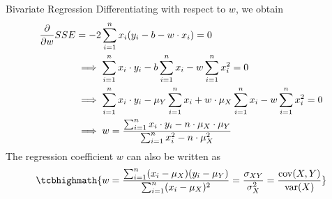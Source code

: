 \begin{frame}{Bivariate Regression}
Differentiating with respect to $w$, we obtain
\begin{align*}
    \frac{\partial}{\partial w} SSE 
    & = -2 \sum_{i=1}^n x_i (y_i - b - w\cdot x_i) = 0 \notag\\
& \implies \sum_{i=1}^n x_i \cdot y_i - b \sum_{i=1}^n x_i  - w \sum_{i=1}^n x_i^2 = 0\\ %
& \implies \sum_{i=1}^n x_i\cdot  y_i - \mu_Y\sum_{i=1}^n x_i + w\cdot \mu_X \sum_{i=1}^n
x_i - w \sum_{i=1}^n x_i^2 = 0 \notag\\
& \implies w = \frac{\sum_{i=1}^n x_i\cdot y_i - n\cdot \mu_X\cdot \mu_Y}{\sum_{i=1}^n
    x_i^2 - n\cdot \mu_X^2}
\end{align*}
%
The regression coefficient $w$ can also be written as
\begin{align*}
    \tcbhighmath{
    w = \frac{\sum_{i=1}^n (x_i - \mu_X)(y_i - \mu_Y)}{\sum_{i=1}^n (x_i
    - \mu_X)^2} = \frac{\sigma_{XY}}{\sigma_X^2} =
\frac{\ocov(X,Y)}{\var(X)}}
\end{align*}
\end{frame}
%
%
%
